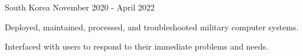 \begin{cventries}
{    {South Korea} %
    {November 2020 - April 2022} %
    {
      \begin{cvitems} %
        \item {Deployed, maintained, processed, and troubleshooted military computer systems.}
        \item {Interfaced with users to respond to their immediate problems and needs.}
      \end{cvitems}
    }
}
\end{cventries}
